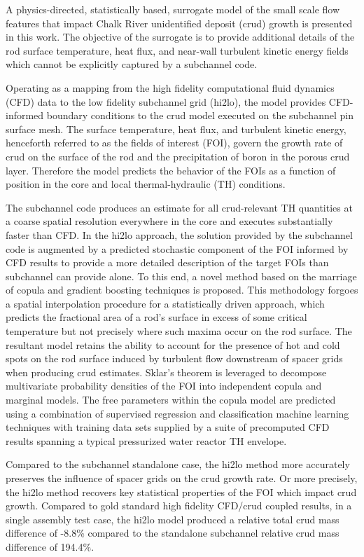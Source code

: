 
\utabstract
{}%
\indent
A physics-directed, statistically based,
surrogate model of the small scale flow features that impact Chalk River unidentified deposit (crud) growth is presented in this work. 
The objective of the surrogate is to provide additional details of the rod surface temperature, heat
flux, and near-wall turbulent kinetic energy fields which cannot be explicitly captured by a subchannel code. 

Operating as a mapping from the high fidelity computational fluid dynamics (CFD) data to the low fidelity subchannel grid (hi2lo), the model provides CFD-informed boundary conditions to the crud model executed on the subchannel pin surface mesh. The surface temperature, heat
flux, and turbulent kinetic energy, henceforth referred to as the fields of interest (FOI),
govern the growth rate of crud on the surface of the rod and the
precipitation of boron in the porous crud layer. Therefore the model predicts the behavior of the
FOIs as a function of position in the core and local thermal-hydraulic (TH) conditions.

The subchannel code produces an estimate for all crud-relevant TH quantities at a coarse spatial resolution everywhere in
the core and executes substantially faster than CFD.  In the hi2lo approach, the solution provided by the subchannel code is augmented by a predicted stochastic
component of the FOI informed by CFD results to provide a more detailed description of the target
FOIs than subchannel can provide alone.  To this end, a novel method based on the marriage of copula and
gradient boosting techniques is proposed. This methodology forgoes a spatial interpolation procedure
for a statistically driven approach, which predicts the fractional area of a rod’s surface in excess of some
critical temperature but not precisely where such maxima occur on the rod surface.
The resultant model retains the ability to account for the presence
of hot and cold spots on the rod surface induced by turbulent flow downstream of spacer grids when
producing crud estimates. Sklar’s theorem is leveraged to decompose multivariate probability densities
of the FOI into independent copula and marginal models. The free parameters within the copula model
are predicted using a combination of supervised regression and classification machine learning techniques
with training data sets supplied by a suite of precomputed CFD results spanning a typical pressurized water reactor TH
envelope.

Compared to the subchannel standalone case, the hi2lo method more accurately preserves the influence of spacer grids on the crud growth rate.  Or more precisely, the hi2lo method recovers key statistical properties of the FOI which impact crud growth.  Compared to gold standard high fidelity CFD/crud coupled results, in a single assembly test case, the hi2lo model produced a relative total crud mass difference of -8.8\% compared to the standalone subchannel relative crud mass difference of 194.4\%.
